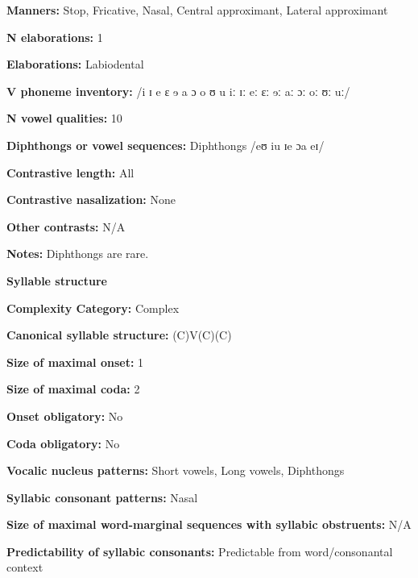 \textbf{Manners:} Stop, Fricative, Nasal, Central approximant, Lateral approximant



\textbf{N elaborations:} 1



\textbf{Elaborations:} Labiodental



\textbf{V phoneme inventory:} /i ɪ e ɛ ɘ a ɔ o ʊ u iː ɪː eː ɛː ɘː aː ɔː oː ʊː uː/



\textbf{N vowel qualities:} 10



\textbf{Diphthongs or vowel sequences:} Diphthongs /eʊ iu ɪe ɔa eɪ/



\textbf{Contrastive length:} All



\textbf{Contrastive nasalization:} None



\textbf{Other contrasts:} N/A



\textbf{Notes:} Diphthongs are rare.



\textbf{Syllable structure}



\textbf{Complexity Category:} Complex



\textbf{Canonical syllable structure:} (C)V(C)(C) \citep[6-9]{Sapir1965}



\textbf{Size of maximal onset:} 1



\textbf{Size of maximal coda:} 2



\textbf{Onset obligatory:} No



\textbf{Coda obligatory:} No



\textbf{Vocalic nucleus patterns:} Short vowels, Long vowels, Diphthongs



\textbf{Syllabic consonant patterns:} Nasal



\textbf{Size of maximal word{}-marginal sequences with syllabic obstruents:} N/A



\textbf{Predictability of syllabic consonants:} Predictable from word/consonantal context




